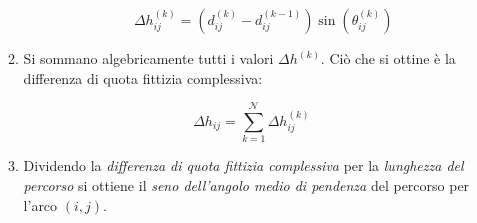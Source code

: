 \begin{enumerate}
\begin{enumerate}
\begin{enumerate}
			\begin{equation}
				\label{eq:fake_quote_diff_partial}
				\Delta h_{ij}^{(k)} = (d_{ij}^{(k)} - d_{ij}^{(k-1)}) \sin(\theta_{ij}^{(k)})
			\end{equation}
	    \end{enumerate}

	    \item Si sommano algebricamente tutti i valori $\Delta h^{(k)}$. Ciò che si ottine è la differenza di quota fittizia complessiva:

	    \begin{equation}
			\label{eq:fake_quote_diff}
			\Delta h_{ij} = \sum_{k = 1}^{\mathcal{N}} \Delta h_{ij}^{(k)}
		\end{equation}

		\item Dividendo la \emph{differenza di quota fittizia complessiva} per la \emph{lunghezza del percorso} si ottiene il \emph{seno dell’angolo medio di pendenza} del percorso per l’arco $(i,j)$.

	  \end{enumerate}
	\end{enumerate}